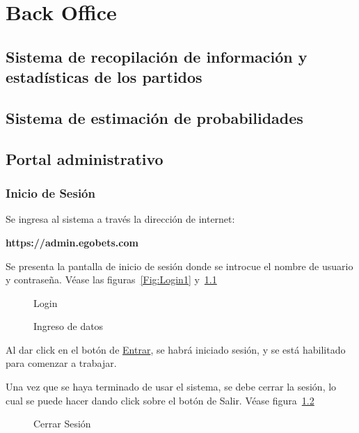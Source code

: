 \chapter{Back Office}
\section{Sistema de recopilación de información y estadísticas de los partidos}
\section{Sistema de estimación de probabilidades}
\section{Portal administrativo}
\graphicspath{{/Users/brunomedina/Dropbox/Tesis-Egobets/egobets-notas/resources/admin/}}

\subsection{Inicio de Sesión}
Se ingresa al sistema a través la dirección de internet: 
\begin{tightcenter}
	\textbf{https://admin.egobets.com}
\end{tightcenter}Se presenta la pantalla de inicio de sesión donde se introcue el nombre de usuario y contraseña. Véase las figuras~\ref{Fig:Login1} y~\ref{Fig:Login2}
\pagebreak
\begin{figure}[!htb]\centering
   \begin{minipage}{0.49\textwidth}
     \caption{Login}\label{Fig:Login1}
   \end{minipage}
   \begin {minipage}{0.49\textwidth}
     \caption{Ingreso de datos}\label{Fig:Login2}
   \end{minipage}
\end{figure}

Al dar click en el botón de \underline{Entrar}, se habrá iniciado sesión, y se está habilitado para comenzar a trabajar.

Una vez que se haya terminado de usar el sistema, se debe cerrar la sesión, lo cual se puede hacer dando click sobre el botón de Salir. Véase figura~\ref{Fig:Logout}

\begin{figure}[!htb]\centering
   \begin {minipage}{0.49\textwidth}
     \caption[Cerrar Sesión]{Cerrar Sesión}\label{Fig:Logout}
   \end{minipage}
\end{figure}

